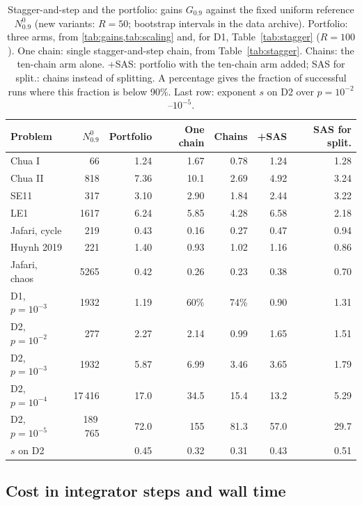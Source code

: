 \begin{table}[tbhp]
\caption{Stagger-and-step and the portfolio: gains $G_{0.9}$ against the fixed uniform reference $N^0_{0.9}$ (new variants: $R=50$; bootstrap intervals in the data archive). Portfolio: three arms, from \cref{tab:gains,tab:scaling} and, for D1, Table~\ref{tab:stagger} ($R=100$). One chain: single stagger-and-step chain, from Table~\ref{tab:stagger}. Chains: the ten-chain arm alone. +SAS: portfolio with the ten-chain arm added; SAS for split.: chains instead of splitting. A percentage gives the fraction of successful runs where this fraction is below 90\%. Last row: exponent $s$ on D2 over $p=10^{-2}$--$10^{-5}$.}
\label{tab:psas}
\centering\footnotesize
\setlength{\tabcolsep}{4pt}
\begin{tabular}{lrrrrrr}
\toprule
Problem & $N^0_{0.9}$ & Portfolio & One chain & Chains & +SAS & SAS for split. \\
\midrule
Chua I & 66 & 1.24 & 1.67 & 0.78 & 1.24 & 1.28 \\
Chua II & 818 & 7.36 & 10.1 & 2.69 & 4.92 & 3.24 \\
SE11 & 317 & 3.10 & 2.90 & 1.84 & 2.44 & 3.22 \\
LE1 & 1617 & 6.24 & 5.85 & 4.28 & 6.58 & 2.18 \\
Jafari, cycle & 219 & 0.43 & 0.16 & 0.27 & 0.47 & 0.94 \\
Huynh 2019 & 221 & 1.40 & 0.93 & 1.02 & 1.16 & 0.86 \\
Jafari, chaos & 5265 & 0.42 & 0.26 & 0.23 & 0.38 & 0.70 \\
D1, $p=10^{-3}$ & 1932 & 1.19 & 60\% & 74\% & 0.90 & 1.31 \\
D2, $p=10^{-2}$ & 277 & 2.27 & 2.14 & 0.99 & 1.65 & 1.51 \\
D2, $p=10^{-3}$ & 1932 & 5.87 & 6.99 & 3.46 & 3.65 & 1.79 \\
D2, $p=10^{-4}$ & 17\,416 & 17.0 & 34.5 & 15.4 & 13.2 & 5.29 \\
D2, $p=10^{-5}$ & 189\,765 & 72.0 & 155 & 81.3 & 57.0 & 29.7 \\
\midrule
$s$ on D2 & & 0.45 & 0.32 & 0.31 & 0.43 & 0.51 \\
\bottomrule
\end{tabular}
\end{table}

\subsection{Cost in integrator steps and wall time}\label{sec:cost}

